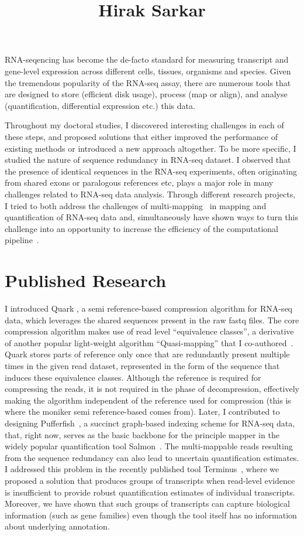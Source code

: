 \documentclass[11pt,a4paper,sans]{moderncv}
\title{Hirak Sarkar}
\begin{document}
\makecvtitle
\setlength{\parindent}{5ex}
RNA-seqencing has become the de-facto standard for measuring transcript and gene-level expression across different cells, tissues, organisms and species. Given the tremendous popularity of the RNA-seq assay, there are numerous tools that are designed to store (efficient disk usage), process (map or align), and analyse (quantification, differential expression etc.) this data.

\setlength{\parindent}{5ex}
Throughout my doctoral studies, I discovered interesting challenges in each of these steps, and proposed solutions that either improved the performance of existing methods or introduced a new approach altogether. To be more specific, I studied the nature of sequence redundancy in RNA-seq dataset. I observed that the presence of identical sequences in the RNA-seq experiments, often originating from shared exons or paralogous references etc, plays a major role in many challenges related to RNA-seq data analysis. Through different research projects, I tried to both address the challenges of multi-mapping~\cite{quark,pufferfish,selaln} in mapping and quantification of RNA-seq data and, simultaneously have shown ways to turn this challenge into an opportunity to increase the efficiency of the computational pipeline~\cite{terminus,rapclust}.

\section{Published Research}
\setlength{\parindent}{5ex}
 I introduced Quark \cite{quark}, a semi reference-based compression algorithm for RNA-seq data, which leverages the shared sequences present in the raw fastq files. The core compression algorithm makes use of read level ``equivalence classes'', a derivative of another popular light-weight algorithm ``Quasi-mapping'' that I co-authored~\cite{rapmap}. Quark stores parts of reference only once that are redundantly present multiple times in the given read dataset, represented in the form of the sequence that induces these equivalence classes. Although the reference is required for compressing the reads, it is not required in the phase of decompression, effectively making the algorithm independent of the reference used for compression (this is where the moniker semi reference-based comes from). Later, I contributed to designing Pufferfish~\cite{pufferfish}, a succinct graph-based indexing scheme for RNA-seq data, that, right now, serves as the basic backbone for the principle mapper in the widely popular quantification tool Salmon~\cite{salmon}. The multi-mappable reads resulting from the sequence redundancy can also lead to uncertain quantification estimates. I addressed this problem in the recently published tool Terminus~\cite{terminus}, where we proposed a solution that produces groups of transcripts when read-level evidence is insufficient to provide robust quantification estimates of individual transcripts. Moreover, we have shown that such groups of transcripts can capture biological information (such as gene families) even though the tool itself has no information about underlying annotation.
\end{document}
